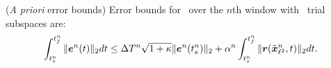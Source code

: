 \begin{theorem}(\textit{A priori} error bounds)\label{theorem:apriori_bound}
Error bounds for \methodAcronymROMs\ over the $n$th window with \spatialAcronym\ trial subspaces are:
\begin{equation}\label{eq:apriori_bound}
\int_{t_s^{n}}^{t_f^{n}} \| \boldsymbol e^{n}(t) \|_2 dt \le \Delta T^{n} \sqrt{1 + \kappa} \|  \boldsymbol e^{n}(t_s^{n})   \|_2   + \alpha^{n} \int_{t_s^{n}}^{t_f^{n}} \|  \boldsymbol r(\tilde{\boldsymbol x}_{\ell^2}^{n},t)  \|_2 dt.
\end{equation}
\end{theorem}
